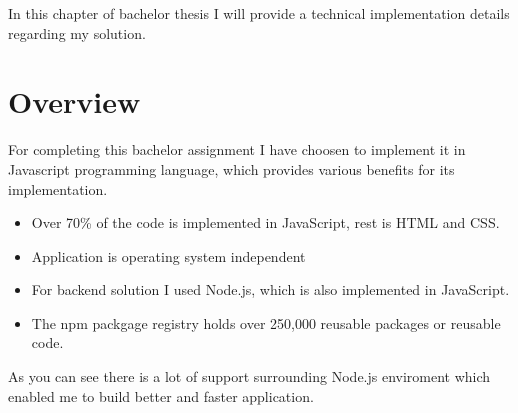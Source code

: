 In this chapter of bachelor thesis I will provide a technical implementation details regarding my solution.
\section{Overview} %
\label{sec:overview}
For completing this bachelor assignment I have choosen to implement it in Javascript programming language, which provides various benefits for its implementation.
\begin{itemize}
\item Over 70\% of the code is implemented in JavaScript, rest is HTML and CSS.
\item Application is operating system independent
\item For backend solution I used Node.js, which is also implemented in JavaScript.
\item The npm packgage registry holds over 250,000 reusable packages or reusable code.
\end{itemize}
As you can see there is a lot of support surrounding Node.js enviroment which enabled me to build better and faster application.
